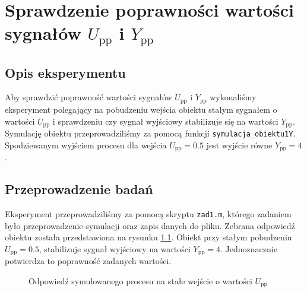 \chapter{Sprawdzenie poprawności wartości sygnałów $U_{\mathrm{pp}}$ i $Y_{\mathrm{pp}}$}
\label{zad1}

\section{Opis eksperymentu}
Aby sprawdzić poprawność wartości sygnałów $U_{\mathrm{pp}}$ i $Y_{\mathrm{pp}}$ wykonaliśmy eksperyment polegający na
pobudzeniu wejścia obiektu stałym sygnałem o wartości $U_{\mathrm{pp}}$ i sprawdzeniu czy sygnał wyjściowy stabilizuje 
się na wartości $Y_{\mathrm{pp}}$. Symulację obiektu przeprowadziliśmy za pomocą funkcji 
\verb+symulacja_obiektu1Y+. Spodziewanym wyjściem procesu dla wejścia $U_{\mathrm{pp}} = \num{0.5}$ jest
wyjście równe $Y_{\mathrm{pp}} = \num{4}$.

\section{Przeprowadzenie badań}
Eksperyment przeprowadziliśmy za pomocą skryptu \verb+zad1.m+, którego zadaniem było przeprowadzenie symulacji 
oraz zapis danych do pliku. Zebrana odpowiedź obiektu została przedstawiona na rysunku \ref{zad1_output}. Obiekt 
przy stałym pobudzeniu $U_{\mathrm{pp}} = \num{0.5}$, stabilizuje sygnał wyjściowy na wartości $Y_{\mathrm{pp}} = \num{4}$.
Jednoznacznie potwierdza to poprawność zadanych wartości.

\begin{figure}[b]
    \centering
    \caption{Odpowiedź symulowanego procesu na stałe wejście o wartości $U_{\mathrm{pp}}$}
    \label{zad1_output}
\end{figure}
